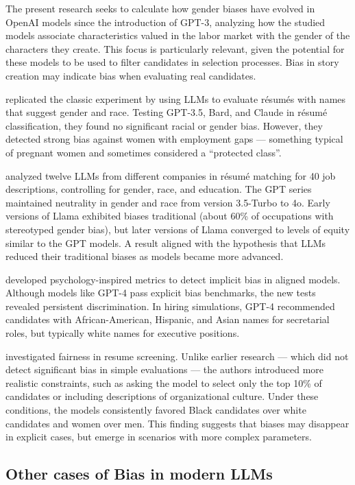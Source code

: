 \documentclass[12pt,a4paper]{article}
\begin{document}
The present research seeks to calculate how gender biases have evolved
in OpenAI models since the introduction of GPT-3, analyzing how the
studied models associate characteristics valued in the labor market with the
gender of the characters they create. This focus is
particularly relevant, given the potential for these models to be
used to filter candidates in selection processes. Bias in
story creation may indicate bias when evaluating
real candidates.

\citet{veldanda2023} replicated the classic experiment by \citet{bertrand2004} using LLMs to evaluate résumés with names that
suggest gender and race. Testing GPT-3.5, Bard, and Claude in résumé
classification, they found no significant racial or gender bias.
However, they detected strong bias against women with employment gaps
--- something typical of pregnant women and sometimes considered a ``protected
class''.

\citet{iso2025} analyzed twelve LLMs from different companies in
résumé matching for 40 job descriptions, controlling for
gender, race, and education. The GPT series maintained neutrality in gender and
race from version 3.5-Turbo to 4o. Early versions of Llama exhibited biases
traditional (about 60\% of occupations with stereotyped gender bias), but later versions of Llama converged to levels of equity similar to the GPT models. A result aligned with the hypothesis that LLMs reduced their traditional biases as models became more advanced.

\citet{bai2024} developed psychology-inspired metrics to detect implicit bias in aligned models. Although models like GPT-4 pass explicit bias benchmarks, the new tests revealed persistent discrimination. In hiring simulations, GPT-4 recommended candidates with African-American, Hispanic, and Asian names for secretarial roles, but typically white names for executive positions.

\citet{karvonen2025} investigated fairness in resume screening. Unlike earlier research --- which did not detect significant bias in simple evaluations --- the authors introduced more realistic constraints, such as asking the model to select only the top 10\% of candidates or including descriptions of organizational culture. Under these conditions, the models consistently favored Black candidates over white candidates and women over men. This finding suggests that biases may disappear in explicit cases, but emerge in scenarios with more complex parameters.


\subsection{Other cases of Bias in modern LLMs}
\end{document}
